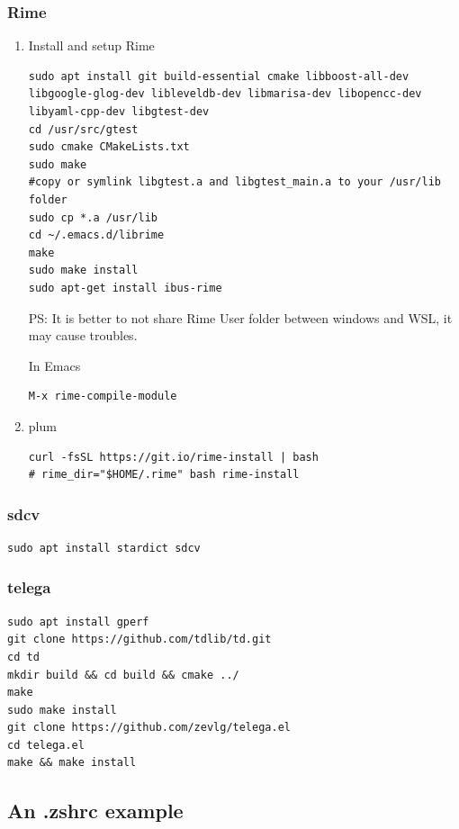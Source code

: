 \documentclass[10pt]{article}
\begin{document}
\subsubsection{Rime}
\label{sec:org2a9face}
\begin{enumerate}
\item Install and setup Rime
\label{sec:orgb66578a}
\begin{verbatim}
sudo apt install git build-essential cmake libboost-all-dev libgoogle-glog-dev libleveldb-dev libmarisa-dev libopencc-dev libyaml-cpp-dev libgtest-dev
cd /usr/src/gtest
sudo cmake CMakeLists.txt
sudo make
#copy or symlink libgtest.a and libgtest_main.a to your /usr/lib folder
sudo cp *.a /usr/lib
cd ~/.emacs.d/librime
make
sudo make install
sudo apt-get install ibus-rime
\end{verbatim}

PS: It is better to not share Rime User folder between windows and WSL, it may cause troubles.

In Emacs
\begin{verbatim}
M-x rime-compile-module
\end{verbatim}

\item plum
\label{sec:org7d743d4}
\begin{verbatim}
curl -fsSL https://git.io/rime-install | bash
# rime_dir="$HOME/.rime" bash rime-install
\end{verbatim}
\end{enumerate}

\subsubsection{sdcv}
\label{sec:orgb32eb9c}
\begin{verbatim}
sudo apt install stardict sdcv
\end{verbatim}

\subsubsection{telega}
\label{sec:orgb680c09}
\begin{verbatim}
sudo apt install gperf
git clone https://github.com/tdlib/td.git
cd td
mkdir build && cd build && cmake ../
make
sudo make install
git clone https://github.com/zevlg/telega.el
cd telega.el
make && make install
\end{verbatim}


\subsection{An .zshrc example}
\label{sec:orgcbb2cc1}
\end{document}
